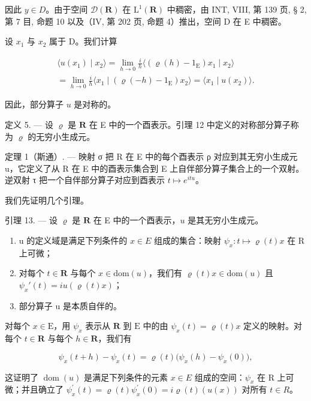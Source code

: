 因此 \(y \in D\)。由于空间 \(\mathcal{D}(\mathbf{R})\) 在 \(\mathrm{L}^{1}(\mathbf{R})\) 中稠密，由 INT, VIII, 第 139 页, § 2, 第 7 目, 命题 10 以及（IV, 第 202 页, 命题 4）推出，空间 D 在 E 中稠密。

设 \(x_{1}\) 与 \(x_{2}\) 属于 D。我们计算

\[
\begin{array}{c} \langle u (x _ {1}) \mid x _ {2} \rangle = \lim _ {h \to 0} \frac {i}{h} \langle (\varrho (h) - 1 _ {\mathrm{E}}) x _ {1} \mid x _ {2} \rangle \\ = \lim _ {h \to 0} \frac {i}{h} \langle x _ {1} \mid (\varrho (- h) - 1 _ {\mathrm{E}}) x _ {2} \rangle = \langle x _ {1} \mid u (x _ {2}) \rangle . \end{array}
\]

因此，部分算子 \(u\) 是对称的。

定义 5. --- 设 \(\varrho\) 是 \(\mathbf{R}\) 在 E 中的一个酉表示。引理 12 中定义的对称部分算子称为 \(\varrho\) 的无穷小生成元。

定理 1（斯通）. --- 映射 σ 把 R 在 E 中的每个酉表示 ρ 对应到其无穷小生成元 u，它定义了从 R 在 E 中的酉表示集合到 E 上自伴部分算子集合上的一个双射。逆双射 τ 把一个自伴部分算子对应到酉表示 \(t \mapsto e^{itu}\)。

我们先证明几个引理。

引理 13. --- 设 \(\varrho\) 是 \(\mathbf{R}\) 在 E 中的一个酉表示，\(u\) 是其无穷小生成元。

\begin{enumerate}
\def\labelenumi{\alph{enumi})}
\item
  u 的定义域是满足下列条件的 \(x \in E\) 组成的集合：映射 \(\psi_{x} \colon t \mapsto \varrho(t)x\) 在 R 上可微；
\item
  对每个 \(t \in \mathbf{R}\) 与每个 \(x \in \mathrm{dom}(u)\)，我们有 \(\varrho(t)x \in \mathrm{dom}(u)\) 且 \(\psi_x'(t) = i u(\varrho(t)x)\)；
\item
  部分算子 u 是本质自伴的。
\end{enumerate}

对每个 \(x \in \mathrm{E}\)，用 \(\psi_x\) 表示从 \(\mathbf{R}\) 到 \(\mathrm{E}\) 中的由 \(\psi_x(t) = \varrho(t)x\) 定义的映射。对每个 \(t \in \mathbf{R}\) 与每个 \(h \in \mathbf{R}\)，我们有

\[
\psi_ {x} (t + h) - \psi_ {x} (t) = \varrho (t) \big (\psi_ {x} (h) - \psi_ {x} (0) \big),
\]

这证明了 \(\operatorname{dom}(u)\) 是满足下列条件的元素 \(x \in E\) 组成的空间：\(\psi_{x}\) 在 R 上可微；并且确立了 \(\psi_{x}^{\prime}(t) = \varrho(t)\psi_{x}^{\prime}(0) = i\varrho(t)(u(x))\) 对所有 \(t \in R\)。

